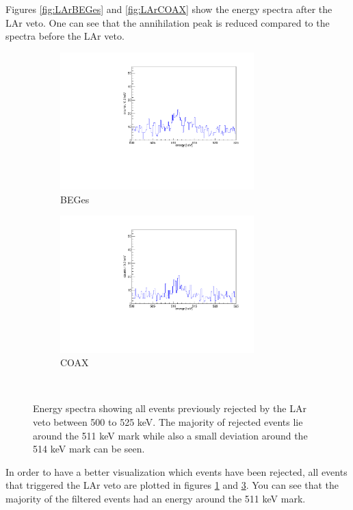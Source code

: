 \documentclass[encoding=utf8,british]{tumphthesis}
\begin{document}
Figures \ref{fig:LArBEGes} and \ref{fig:LArCOAX} show the energy spectra after the LAr veto.
One can see that the annihilation peak is reduced compared to the spectra before the LAr veto.
\\

\begin{figure}[t!]
	\centering
	\begin{subfigure}{.5\textwidth}
		\includegraphics[width=75mm]{./Bilder/AntiLArBEGe.pdf}
		\caption{BEGes}
		\label{fig:AntiLArBEGes}
	\end{subfigure}\hfill%
	\begin{subfigure}{.5\textwidth}
		\includegraphics[width=75mm]{./Bilder/AntiLArCOAX.pdf}
		\caption{COAX}
		\label{fig:AntiLArCOAX}
	\end{subfigure}
	\\
	\vspace{0.5cm}
	\caption{
	Energy spectra showing all events previously rejected by the LAr veto between 500 to 525 keV.
	The majority of rejected events lie around the 511 keV mark while also a small deviation around the 514 keV mark can be seen.
	}
\end{figure}

In order to have a better visualization which events have been rejected, all events that triggered the LAr veto are plotted in figures \ref{fig:AntiLArBEGes} and \ref{fig:AntiLArCOAX}.
You can see that the majority of the filtered events had an energy around the 511 keV mark.
\\
\end{document}

